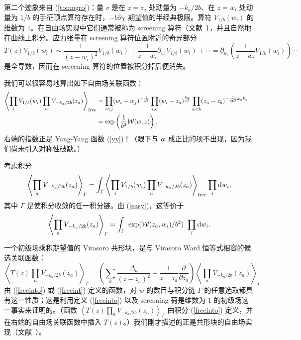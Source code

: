 第二个迹象来自 (\ref{tomogro})：量 $v$ 是在 $z=z_a$ 处动量为 $- {k_a}/{2b}$、在 $z=w_i$ 处动量为 $1/b$ 的手征顶点算符存在时，$-b \partial \chi$ 期望值的半经典极限。算符 $V_{1/b}(w_i)$ 的维数为 $1$。在自由场实现中它们通常被称为 screening 算符（文献~\cite{DF,Felder}），并且自然地在曲线上积分。应力张量在 screening 算符位置附近的奇异部分
\begin{equation}
T(z) V_{1/b}(w_i) \sim \frac{1}{(z-w_i)^2} V_{1/b}(w_i)  +
\frac{1}{z-w_i} \partial_{w_i} V_{1/b}(w_i) +\cdots = \partial_{w_i}
\left( \frac{1}{z-w_i} V_{1/b}(w_i) \right) \cdots
\end{equation}
是全导数，因而在 screening 算符的位置被积分掉后便消失。

我们可以很容易地算出如下自由场关联函数：
\begin{align}\label{easy}
\left\langle \prod_i  V_{1/b}(w_i)
\prod_a  V_{-k_a/2b}(z_a)  \right\rangle_{\mathrm{free}}& = \prod_{i < j}(w_i - w_j)^{-\frac{2}{b^2}
}\prod_{i,a}(w_i - z_a)^{\frac{k_a}{b^2}}
\prod_{a <b}(z_a - z_b)^{-\frac{1}{2b^2}k_a k_b}\cr & = \exp\left({\frac{1}{b^2} {\mathcal W}(w,z)}\right).
\end{align}
右端的指数正是 Yang-Yang 函数 (\ref{yy})！（眼下与 ${\boldsymbol{a}}$ 成正比的项不出现，因为我们尚未引入对称性破缺。）

考虑积分
\begin{equation} \label{freeinto}
\left\langle  \prod_a  V_{-k_a/2b}(z_a)
\right\rangle_{\Gamma} = \int_\Gamma \left\langle \prod_i
 V_{1/b}(w_i)  \prod_a  V_{-k_a/2b}(z_a)  \right\rangle_{\mathrm{free}}
\prod_i {\mathrm d} w_i,
\end{equation}
其中 $\Gamma$ 是使积分收敛的任一积分链。由 (\ref{easy})，这等价于
\begin{equation} \label{freeint}\left
\langle  \prod_a  V_{-k_a/2b}(z_a)\right
\rangle_{\Gamma} = \int_\Gamma \,\,\exp({\mathcal W}(z_a,w_i)/b^2)\,\,\prod_i {\mathrm d} w_i.
\end{equation}


一个初级场乘积期望值的 Virasoro 共形块，是与 Virasoro Ward 恒等式相容的候选关联函数：
\begin{equation}\left
\langle  T(z) \prod_a  V_{-k_a/2b}(z_a)  \right\rangle_{\Gamma} =
\left( \sum_a \frac{\Delta_a}{(z-z_a)^2} +
\frac{1}{z-z_a} \frac{\partial}{\partial z_a} \right)\left \langle
\prod_a  V_{-k_a/2b}(z_a) \right \rangle_{\Gamma}
\end{equation}
由 (\ref{freeinto}) 或 (\ref{freeint}) 定义的函数，对 $w$ 的数目与积分链 $\Gamma$ 的任意选取都具有这一性质；这是利用定义 (\ref{freeinto}) 以及 screening 荷是维数为 1 的初级场这一事实来证明的。（函数 $\left\langle  T(z) \prod_a  V_{-k_a/2b}(z_a) \right \rangle_{\Gamma} $ 由积分 (\ref{freeinto}) 定义，并在右端的自由场关联函数中插入 $T(z)$。）我们刚才描述的正是共形块的自由场实现（文献~\cite{DF,Felder}）。

